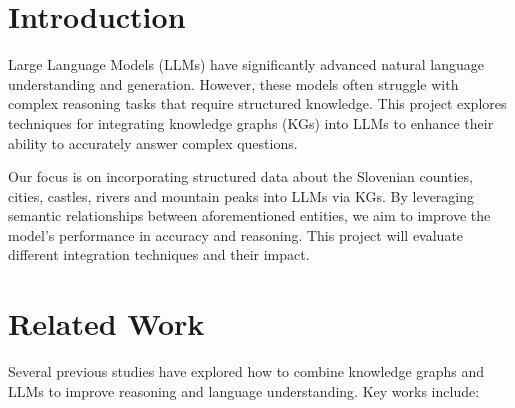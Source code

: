 \documentclass[fleqn,moreauthors,10pt]{ds_report}
\affiliation{\textit{Advisor: Slavko Žitnik}}
\begin{document}
\flushbottom

\maketitle

\thispagestyle{empty}


\section*{Introduction}
Large Language Models (LLMs) have significantly advanced natural language understanding and generation. However, these models often struggle with complex reasoning tasks that require structured knowledge. This project explores techniques for integrating knowledge graphs (KGs) into LLMs to enhance their ability to accurately answer complex questions.

Our focus is on incorporating structured data about the Slovenian counties, cities, castles, rivers and mountain peaks into LLMs via KGs. By leveraging semantic relationships between aforementioned entities, we aim to improve the model's performance in accuracy and reasoning. This project will evaluate different integration techniques and their impact.

\section*{Related Work}
Several previous studies have explored how to combine knowledge graphs and LLMs to improve reasoning and language understanding. Key works include:
\end{document}
